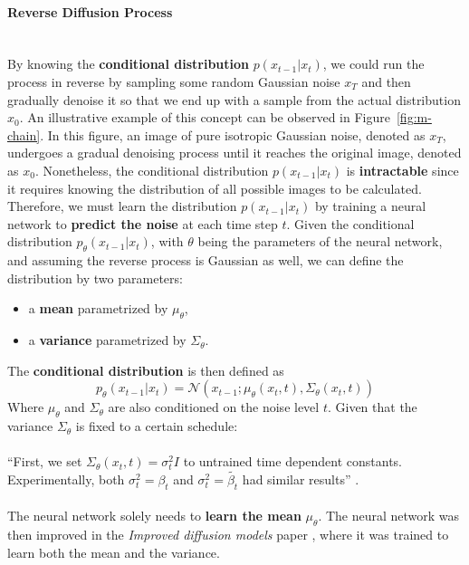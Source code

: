 \documentclass[preprint]{elsarticle}
\begin{document}
\paragraph{Reverse Diffusion Process}\mbox{}\\
By knowing the \textbf{conditional distribution} $p(x_{t-1}|x_t)$, 
we could run the process in reverse by sampling some random Gaussian noise $x_T$
and then gradually denoise it so that we end up with a sample from the actual distribution $x_0$.
An illustrative example of this concept can be observed in Figure~\ref{fig:m-chain}. In this figure, an image of pure isotropic Gaussian noise, denoted as $x_T$, undergoes a gradual denoising process until it reaches the original image, denoted as $x_0$.
Nonetheless, the conditional distribution $p(x_{t-1}|x_t)$ is \textbf{intractable} since 
it requires knowing the distribution of all possible images to be calculated.
Therefore, we must learn the distribution $p(x_{t-1}|x_t)$ by training a neural network to \textbf{predict the noise} at each time step $t$.
Given the conditional distribution $p_\theta(x_{t-1}|x_t)$, 
with $\theta$ being the parameters of the neural network, 
and assuming the reverse process is Gaussian as well, 
we can define the distribution by two parameters:
\begin{itemize}
	\item a \textbf{mean} parametrized by $\mu_\theta$,
	\item a \textbf{variance} parametrized by $\Sigma_\theta$.
\end{itemize}
The \textbf{conditional distribution} is then defined as
\begin{equation}
	p_\theta(x_{t-1}|x_t) = \mathcal{N}(x_{t-1}; \mu_\theta(x_t,t), \Sigma_\theta(x_t,t))
\end{equation}
Where $\mu_\theta$ and $\Sigma_\theta$ are also conditioned on the noise level $t$.
Given that the variance $\Sigma_\theta$ is fixed to a certain schedule:\\\\
``First, we set $\Sigma_\theta(x_t,t)=\sigma_t^2I$ to untrained time dependent constants.
Experimentally, both $\sigma_t^2=\beta_t$ and $\sigma_t^2=\tilde{\beta_t}$ had similar results'' 
\cite{ho2020denoising}.\\\\
The neural network solely needs to \textbf{learn the mean} $\mu_\theta$.
The neural network was then improved in the \emph{Improved diffusion models} paper \cite{nichol2021improved}, 
where it was trained to learn both the mean and the variance.
\end{document}
